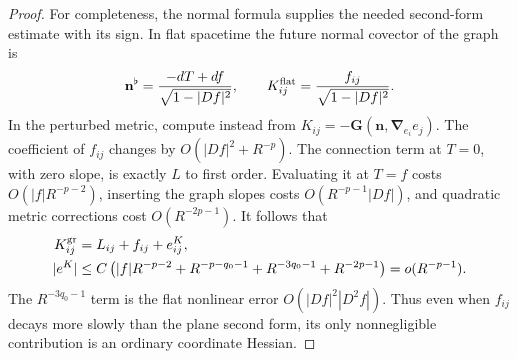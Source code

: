 \begin{proof}
For completeness, the normal formula supplies the needed second-form
estimate with its sign.  In flat spacetime the future normal covector
of the graph is
\[
 \mathbf n^\flat
 =\frac{-dT+df}{\sqrt{1-|Df|^2}},
 \qquad
 K^{\rm flat}_{ij}
 =\frac{f_{ij}}{\sqrt{1-|Df|^2}}.
\]
In the perturbed metric, compute instead from
$K_{ij}=-\mathbf G(\mathbf n,\boldsymbol\nabla_{e_i}e_j)$.
The coefficient of $f_{ij}$ changes by
$O(|Df|^2+R^{-p})$.  The connection term at $T=0$, with zero slope,
is exactly $L$ to first order.  Evaluating it at $T=f$ costs
$O(|f|R^{-p-2})$, inserting the graph slopes costs
$O(R^{-p-1}|Df|)$, and quadratic metric corrections cost
$O(R^{-2p-1})$.  It follows that
\begin{equation}
 \begin{split}
 K^{\rm gr}_{ij}&=L_{ij}+f_{ij}+e^{K}_{ij},\\
 |e^K|&\le C\left(
 |f|R^{-p-2}+R^{-p-q_0-1}
       +R^{-3q_0-1}+R^{-2p-1}\right)
       =o(R^{-p-1}).
 \end{split}
 \label{q:converse:eq:graph-second-error}
\end{equation}
The $R^{-3q_0-1}$ term is the flat nonlinear error
$O(|Df|^2|D^2f|)$.  Thus even when $f_{ij}$ decays more slowly than
the plane second form, its only nonnegligible contribution is an
ordinary coordinate Hessian.


\end{proof}
